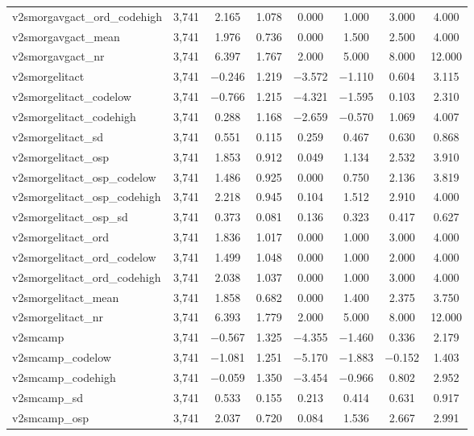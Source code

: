 \begin{table}[!htbp]
\begin{tabular}{@{\extracolsep{5pt}}lccccccc}
v2smorgavgact\_ord\_codehigh & 3,741 & 2.165 & 1.078 & 0.000 & 1.000 & 3.000 & 4.000 \\ 
v2smorgavgact\_mean & 3,741 & 1.976 & 0.736 & 0.000 & 1.500 & 2.500 & 4.000 \\ 
v2smorgavgact\_nr & 3,741 & 6.397 & 1.767 & 2.000 & 5.000 & 8.000 & 12.000 \\ 
v2smorgelitact & 3,741 & $-$0.246 & 1.219 & $-$3.572 & $-$1.110 & 0.604 & 3.115 \\ 
v2smorgelitact\_codelow & 3,741 & $-$0.766 & 1.215 & $-$4.321 & $-$1.595 & 0.103 & 2.310 \\ 
v2smorgelitact\_codehigh & 3,741 & 0.288 & 1.168 & $-$2.659 & $-$0.570 & 1.069 & 4.007 \\ 
v2smorgelitact\_sd & 3,741 & 0.551 & 0.115 & 0.259 & 0.467 & 0.630 & 0.868 \\ 
v2smorgelitact\_osp & 3,741 & 1.853 & 0.912 & 0.049 & 1.134 & 2.532 & 3.910 \\ 
v2smorgelitact\_osp\_codelow & 3,741 & 1.486 & 0.925 & 0.000 & 0.750 & 2.136 & 3.819 \\ 
v2smorgelitact\_osp\_codehigh & 3,741 & 2.218 & 0.945 & 0.104 & 1.512 & 2.910 & 4.000 \\ 
v2smorgelitact\_osp\_sd & 3,741 & 0.373 & 0.081 & 0.136 & 0.323 & 0.417 & 0.627 \\ 
v2smorgelitact\_ord & 3,741 & 1.836 & 1.017 & 0.000 & 1.000 & 3.000 & 4.000 \\ 
v2smorgelitact\_ord\_codelow & 3,741 & 1.499 & 1.048 & 0.000 & 1.000 & 2.000 & 4.000 \\ 
v2smorgelitact\_ord\_codehigh & 3,741 & 2.038 & 1.037 & 0.000 & 1.000 & 3.000 & 4.000 \\ 
v2smorgelitact\_mean & 3,741 & 1.858 & 0.682 & 0.000 & 1.400 & 2.375 & 3.750 \\ 
v2smorgelitact\_nr & 3,741 & 6.393 & 1.779 & 2.000 & 5.000 & 8.000 & 12.000 \\ 
v2smcamp & 3,741 & $-$0.567 & 1.325 & $-$4.355 & $-$1.460 & 0.336 & 2.179 \\ 
v2smcamp\_codelow & 3,741 & $-$1.081 & 1.251 & $-$5.170 & $-$1.883 & $-$0.152 & 1.403 \\ 
v2smcamp\_codehigh & 3,741 & $-$0.059 & 1.350 & $-$3.454 & $-$0.966 & 0.802 & 2.952 \\ 
v2smcamp\_sd & 3,741 & 0.533 & 0.155 & 0.213 & 0.414 & 0.631 & 0.917 \\ 
v2smcamp\_osp & 3,741 & 2.037 & 0.720 & 0.084 & 1.536 & 2.667 & 2.991 \\ 

\end{tabular}
\end{table}
